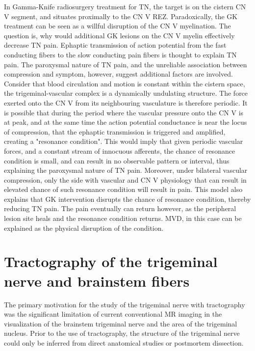 In Gamma-Knife radiosurgery treatment for TN, the target is on the cistern CN V segment, and situates proximally to the CN V REZ. Paradoxically, the GK treatment can be seen as a willful disruption of the CN V myelination. The question is, why would additional GK lesions on the CN V myelin effectively decrease TN pain. Ephaptic transmission of action potential from the fast conducting fibers to the slow conducting pain fibers is thought to explain TN pain. The paroxysmal nature of TN pain, and the unreliable association between compression and symptom, however, suggest additional factors are involved. Consider that blood circulation and motion is constant within the cistern space, the trigeminal-vascular complex is a dynamically undulating structure. The force exerted onto the CN V from its neighbouring vasculature is therefore periodic. It is possible that during the period where the vascular pressure onto the CN V is at peak, and at the same time the action potential conductance is near the locus of compression, that the ephaptic transmission is triggered and amplified, creating a "resonance condition". This would imply that given periodic vascular forces, and a constant stream of innocuous afferents, the chance of resonance condition is small, and can result in no observable pattern or interval, thus explaining the paroxysmal nature of TN pain. Moreover, under bilateral vascular compression, only the side with vascular and CN V physiology that can result in elevated chance of such resonance condition will result in pain. This model also explains that GK intervention disrupts the chance of resonance condition, thereby reducing TN pain. The pain eventually can return however, as the peripheral lesion site heals and the resonance condition returns. MVD, in this case can be explained as the physical disruption of the condition.

\section{Tractography of the trigeminal nerve and brainstem fibers}

The primary motivation for the study of the trigeminal nerve with tractography was the significant limitation of current conventional MR imaging in the visualization of the brainstem trigeminal nerve and the area of the trigeminal nucleus. Prior to the use of tractography, the structure of the trigeminal nerve could only be inferred from direct anatomical studies or postmortem dissection. 

